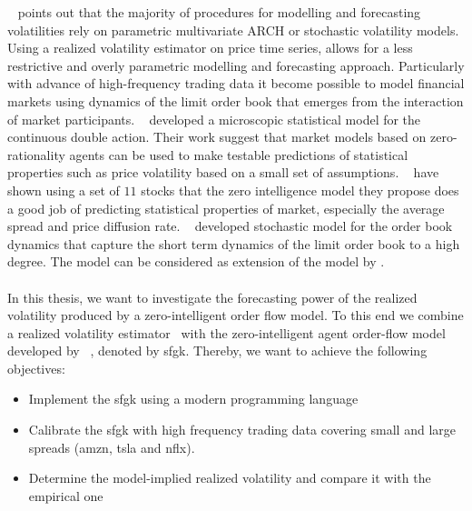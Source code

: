 \documentclass[11pt, a4paper]{thesis}  %
\begin{document}
%
\citeauthor{Andersen:2003:modeling_forcasting_rv}~\cite{Andersen:2003:modeling_forcasting_rv} points out that the majority of procedures for modelling and forecasting volatilities rely on parametric multivariate ARCH or stochastic volatility models. Using a realized volatility estimator on price time series, allows for a less restrictive and overly parametric modelling and forecasting approach. 
Particularly with advance of high-frequency trading data it become possible to model financial markets using dynamics of the limit order book that emerges from the interaction of market participants.
%
\citeauthor{Smith:2003:StatisticalModel}~\cite{Smith:2003:StatisticalModel} developed a microscopic statistical model for the continuous double action. Their work suggest that market models based on zero-rationality agents can be used to make testable predictions of statistical properties such as price volatility based on a small set of assumptions.
% 
\citeauthor{Farmer:2005:Model}~\cite{Farmer:2005:Model} have shown using a set of $11$ stocks that the zero intelligence model they propose does a good job of predicting statistical properties of market, especially the average spread and price diffusion rate.
%
\citeauthor{Cont:2010:model}~\cite{Cont:2010:model} developed stochastic model for the order book dynamics that capture the short term dynamics of the limit order
book to a high degree. The model can be considered as extension of the model by \citeauthor{Smith:2003:StatisticalModel}.
%
%
\\
\\
\noindent In this thesis, we want to investigate the forecasting power of the realized volatility produced by a zero-intelligent order flow model. To this end we combine a realized volatility estimator~\citep{Anderson:2000:GreatRealisations} with the zero-intelligent agent order-flow model developed by \citeauthor{Smith:2003:StatisticalModel}~\cite{Smith:2003:StatisticalModel}, denoted by \ac{sfgk}. Thereby, we want to achieve the following objectives: 

\begin{itemize}
	\item Implement the \ac{sfgk} using a modern programming language 
	\item Calibrate the \ac{sfgk} with high frequency trading data covering small and large 	spreads (\ac{amzn}, \ac{tsla} and \ac{nflx}).
	\item Determine the model-implied realized volatility and compare it with the empirical one
\end{itemize} 
%
\end{document}
